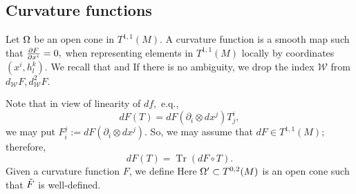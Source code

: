\subsection*{Curvature functions}
Let $\O$ be an open cone in $T^{1,1}(M).$ A curvature function is a smooth map
such that $\fr{\del F}{\del x^i}=0,$ when representing elements in $T^{1,1}(M)$ locally by coordinates $(x^i,h^k_l)$.
We recall that
and
If there is no ambiguity, we drop the index $\mathcal{W}$ from $d_\mathcal{W}F, d^2_\mathcal{W}F.$

Note that in view of linearity of $df,$ e.q.,
\[dF(T)=dF(\partial_i\otimes dx^j)T_j^i,\]
we may put $F^j_i:=dF(\partial_i\otimes dx^j)$. So, we may assume that $dF\in T^{1,1}(M);$ therefore,
\[dF(T)=\operatorname{Tr}(dF\circ T).\]
Given a curvature function $F$, we define
Here $\O'\sub T^{0,2}(M)$ is an open cone such that $\~F$ is well-defined.

